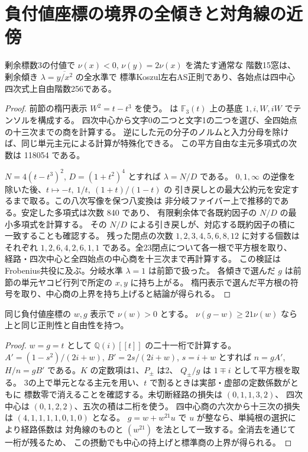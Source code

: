 \section{負付値座標の境界の全傾きと対角線の近傍}
\label{sec:rank-fifteen-negative-x-boundary}
\begin{theorem}\label{thm:rank-fifteen-negative-x-boundary}
剰余標数3の付値で $\nu(x)<0$, $\nu(y)=2\nu(x)$ を満たす通常な
階数15窓は、剰余傾き $\lambda=\overline{y/x^2}$ の全水準で
標準Koszul左右AS正則であり、各始点は四中心四次式上自由階数256である。
\end{theorem}
\begin{proof}
前節の楕円表示 $W^2=t-t^3$ を使う。
は $\mathbb F_3(t)$ 上の基底 $1,i,W,iW$ でテンソルを構成する。
四次中心から文字0の二つと文字1の二つを選び、全四始点の十三次までの商を計算する。
逆にした元の分子のノルムと入力分母を除けば、同じ単元主元による計算が特殊化できる。
この平方自由な主元多項式の次数は 118054 である。

$N=4(t-t^3)^2$, $D=(1+t^2)^4$ とすれば $\lambda=N/D$ である。
$0,1,\infty$ の逆像を除いた後、$t\mapsto-t,\ 1/t,\ (1+t)/(1-t)$ の
引き戻しとの最大公約元を安定するまで取る。この八次写像を保つ八変換は
非分岐ファイバー上で推移的である。安定した多項式は次数 840 であり、
有限剰余体で各既約因子の $N/D$ の最小多項式を計算する。
その $N/D$ による引き戻しが、対応する既約因子の積に一致することも確認する。
残った閉点の次数 $1,2,3,4,5,6,8,12$ に対する個数はそれぞれ
$1,2,6,4,2,6,1,1$ である。全23閉点について各一根で平方根を取り、
経路・四次中心と全四始点の中心商を十三次まで再計算する。
この検証はFrobenius共役に及ぶ。分岐水準 $\lambda=1$ は前節で扱った。
各傾きで選んだ $g$ は前節の単元ヤコビ行列で所定の $x,y$ に持ち上がる。
楕円表示で選んだ平方根の符号を取り、中心商の上界を持ち上げると結論が得られる。
\end{proof}

\begin{proposition}\label{prop:rank-fifteen-negative-x-diagonal}
同じ負付値座標の $w,g$ 表示で $\nu(w)>0$ とする。
$\nu(g-w)\ge21\nu(w)$ なら上と同じ正則性と自由性を持つ。
\end{proposition}
\begin{proof}
$w=g=t$ として $\mathbb Q(i)[[t]]$ の二十一桁で計算する。
$A'=(1-s^2)/(2i+w)$, $B'=2s/(2i+w)$, $s=i+w$ とすれば
$n=gA'$, $H/n=gB'$ である。$K$ の定数項は1、$P_\pm$ は2、
$Q_\pm/g$ は $1\mp i$ として平方根を取る。
3の上で単元となる主元を用い、$t$ で割るときは実部・虚部の定数係数がともに
標数零で消えることを確認する。未切断経路の損失は $(0,1,1,3,2)$、
四次中心は $(0,1,2,2)$、五次の積は二桁を使う。
四中心商の六次から十三次の損失は $(4,1,1,1,1,0,1,0)$ となる。
$g=w+w^{21}u$ で $u$ が整なら、単純根の選択により経路係数は
対角線のものと $(w^{21})$ を法として一致する。全消去を通じて一桁が残るため、
この摂動でも中心の持上げと標準商の上界が得られる。
\end{proof}

